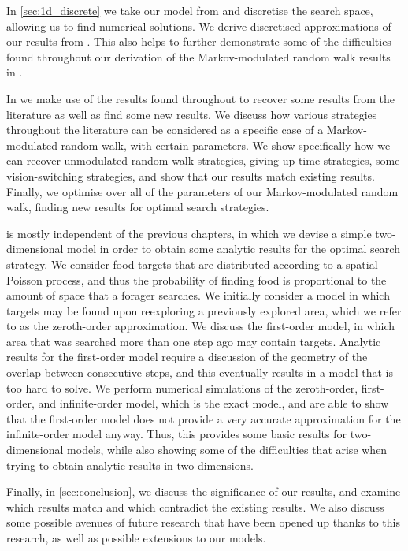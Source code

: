 In \cref{sec:1d_discrete} we take our model from  and discretise the search space, allowing us to find numerical solutions. We derive discretised approximations of our results from . This  also helps to further demonstrate some of the difficulties found throughout our derivation of the Markov-modulated random walk results in .

In  we make use of the results found throughout  to recover some results from the literature as well as find some new results. We discuss how various strategies throughout the literature can be considered as a specific case of a Markov-modulated random walk, with certain parameters. We show specifically how we can recover unmodulated random walk strategies, giving-up time strategies, some vision-switching strategies, and show that our results match existing results. Finally, we optimise over all of the parameters of our Markov-modulated random walk, finding new results for optimal search strategies.

 is mostly independent of the previous chapters, in which we devise a simple two-dimensional model in order to obtain some analytic results for the optimal search strategy. We consider food targets that are distributed according to a spatial Poisson process, and thus the probability of finding food is proportional to the amount of space that a forager searches. We initially consider a model in which targets may be found upon reexploring a previously explored area, which we refer to as the zeroth-order approximation. We discuss the first-order model, in which area that was searched more than one step ago may contain targets. Analytic results for the first-order model require a discussion of the geometry of the overlap between consecutive steps, and this eventually results in a model that is too hard to solve. We perform numerical simulations of the zeroth-order, first-order, and infinite-order model, which is the exact model, and are able to show that the first-order model does not provide a very accurate approximation for the infinite-order model anyway. Thus, this  provides some basic results for two-dimensional models, while also showing some of the difficulties that arise when trying to obtain analytic results in two dimensions.

Finally, in \cref{sec:conclusion}, we discuss the significance of our results, and examine which results match and which contradict the existing results. We also discuss some possible avenues of future research that have been opened up thanks to this research, as well as possible extensions to our models.







